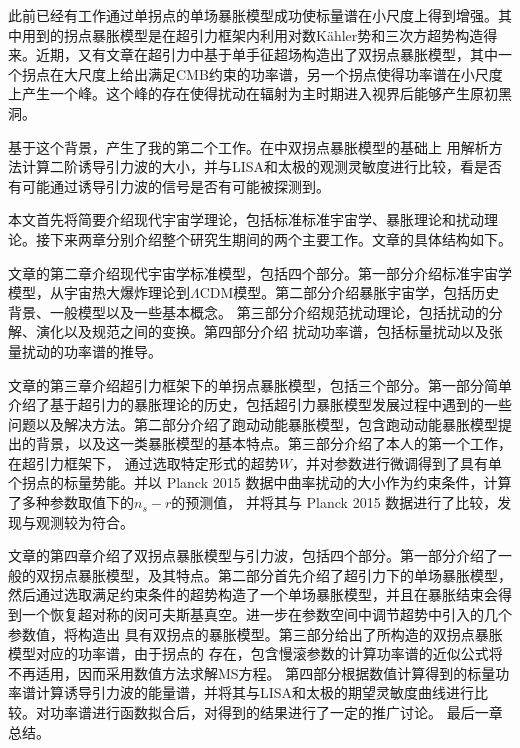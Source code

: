 此前已经有工作\citep{garcia1702phys}通过单拐点的单场暴胀模型成功使标量谱在小尺度上得到增强。其中用到的拐点暴胀模型是在超引力框架内利用对数K\"ahler势和三次方超势构造得来\citep{gao2015inflection}。近期，又有文章在超引力中基于单手征超场构造出了双拐点暴胀模型\citep{gao2018primordial}，其中一个拐点在大尺度上给出满足CMB约束的功率谱，另一个拐点使得功率谱在小尺度上产生一个峰。这个峰的存在使得扰动在辐射为主时期进入视界后能够产生原初黑洞。

基于这个背景，产生了我的第二个工作。在\citep{gao2018primordial}中双拐点暴胀模型的基础上
用解析方法计算二阶诱导引力波的大小，并与LISA和太极的观测灵敏度进行比较，看是否有可能通过诱导引力波的信号是否有可能被探测到。

本文首先将简要介绍现代宇宙学理论，包括标准标准宇宙学、暴胀理论和扰动理论。接下来两章分别介绍整个研究生期间的两个主要工作。文章的具体结构如下。

文章的第二章介绍现代宇宙学标准模型，包括四个部分。第一部分介绍标准宇宙学模型，从宇宙热大爆炸理论到$\Lambda$CDM模型。第二部分介绍暴胀宇宙学，包括历史背景、一般模型以及一些基本概念。
第三部分介绍规范扰动理论，包括扰动的分解、演化以及规范之间的变换。第四部分介绍
扰动功率谱，包括标量扰动以及张量扰动的功率谱的推导。

文章的第三章介绍超引力框架下的单拐点暴胀模型，包括三个部分。第一部分简单介绍了基于超引力的暴胀理论的历史，包括超引力暴胀模型发展过程中遇到的一些问题以及解决方法。第二部分介绍了跑动动能暴胀模型，包含跑动动能暴胀模型提出的背景，以及这一类暴胀模型的基本特点。第三部分介绍了本人的第一个工作，在超引力框架下，
通过选取特定形式的超势$W$，并对参数进行微调得到了具有单个拐点的标量势能。并以
Planck 2015
数据中曲率扰动的大小作为约束条件，计算了多种参数取值下的$n_{s}-r$的预测值，
并将其与 Planck 2015 数据进行了比较，发现与观测较为符合。

文章的第四章介绍了双拐点暴胀模型与引力波，包括四个部分。第一部分介绍了一般的双拐点暴胀模型，及其特点。第二部分首先介绍了超引力下的单场暴胀模型，
然后通过选取满足约束条件的超势构造了一个单场暴胀模型，并且在暴胀结束会得到一个恢复超对称的闵可夫斯基真空。进一步在参数空间中调节超势中引入的几个参数值，将构造出
具有双拐点的暴胀模型。第三部分给出了所构造的双拐点暴胀模型对应的功率谱，由于拐点的
存在，包含慢滚参数的计算功率谱的近似公式将不再适用，因而采用数值方法求解MS方程。
第四部分根据数值计算得到的标量功率谱计算诱导引力波的能量谱，并将其与LISA\citep{amaro2017laser}和太极\citep{guo2018taiji}的期望灵敏度曲线进行比较。对功率谱进行函数拟合后，对得到的结果进行了一定的推广讨论。
最后一章总结。
